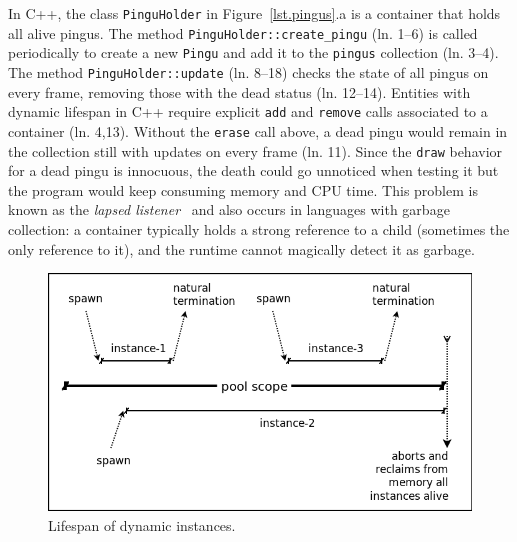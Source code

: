 \documentclass{vgtc}                          %
\newcommand{\code}[1] {{\small{\texttt{#1}}}}
\begin{document}
In C++, the class \code{PinguHolder} in Figure~\ref{lst.pingus}.a is a
container that holds all alive pingus.
%
The method \code{PinguHolder::create\_pingu} (ln. 1--6) is called periodically
to create a new \code{Pingu} and add it to the \code{pingus} collection
(ln. 3--4).
The method \code{PinguHolder::update} (ln. 8--18) checks the state of all
pingus on every frame, removing those with the dead status (ln. 12--14).
%
Entities with dynamic lifespan in C++ require explicit \code{add} and
\code{remove} calls associated to a container (ln. 4,13).
Without the \code{erase} call above, a dead pingu would remain in the
collection still with updates on every frame (ln. 11).
Since the \code{draw} behavior for a dead pingu is innocuous, the death could
go unnoticed when testing it but the program would keep consuming memory and
CPU time.
This problem is known as the \emph{lapsed listener}~\cite{games.patterns} and
also occurs in languages with garbage collection:
a container typically holds a strong reference to a child (sometimes the only 
reference to it), and the runtime cannot magically detect it as garbage.

\begin{figure}[t]
\centering
\includegraphics[width=\columnwidth]{pool}
\caption{Lifespan of dynamic instances.
\label{fig.pool}
}
\end{figure}
\end{document}
